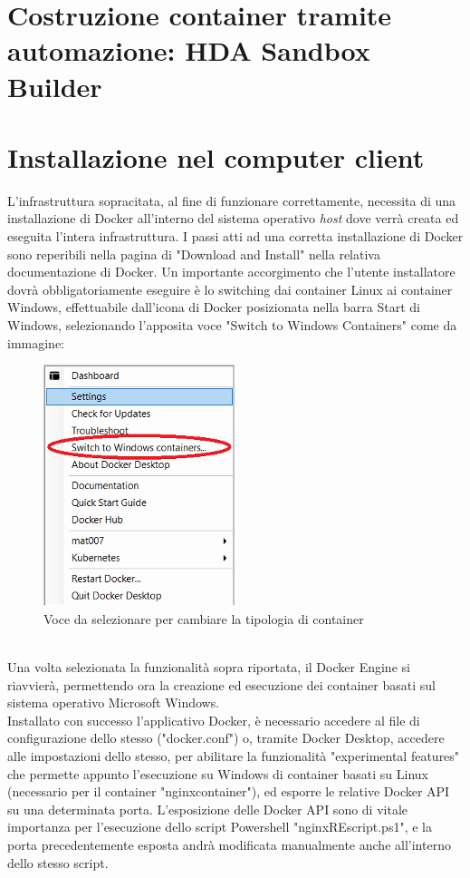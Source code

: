 \section{Costruzione container tramite automazione: HDA Sandbox Builder}
\newpage
\section{Installazione nel computer client}
L'infrastruttura sopracitata, al fine di funzionare correttamente, necessita di una installazione di Docker all'interno del sistema operativo \textit{host} dove verrà creata ed eseguita l'intera infrastruttura.
I passi atti ad una corretta installazione di Docker sono reperibili nella pagina di "Download and Install" nella relativa documentazione di Docker. Un importante accorgimento che l'utente installatore dovrà obbligatoriamente eseguire è lo switching dai container Linux ai container Windows, effettuabile dall'icona di Docker posizionata nella barra Start di Windows, selezionando l'apposita voce "Switch to Windows Containers" come da immagine:
\begin{figure}[!h]     
\centering 
    \includegraphics[width=0.2\columnwidth]{immagini/img/switch_windows_container} 
    \caption{Voce da selezionare per cambiare la tipologia di container}
\end{figure}\\
Una volta selezionata la funzionalità sopra riportata, il Docker Engine si riavvierà, permettendo ora la creazione ed esecuzione dei container basati sul sistema operativo Microsoft Windows.\\
Installato con successo l'applicativo Docker, è necessario accedere al file di configurazione dello stesso ("docker.conf") o, tramite Docker Desktop, accedere alle impostazioni dello stesso, per abilitare la funzionalità "experimental features" che permette appunto l'esecuzione su Windows di container basati su Linux (necessario per il container "nginxcontainer"), ed esporre le relative Docker API su una determinata porta.
L'esposizione delle Docker API sono di vitale importanza per l'esecuzione dello script Powershell "nginxREscript.ps1", e la porta precedentemente esposta andrà modificata manualmente anche all'interno dello stesso script.
